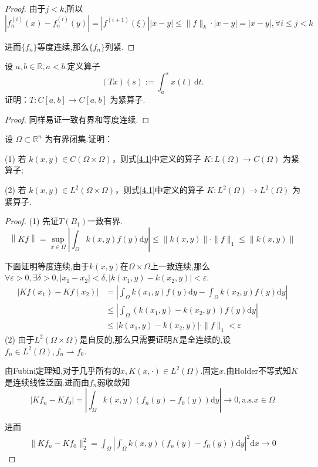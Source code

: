 \documentclass[lang=cn,newtx,10pt,scheme=chinese,thmcnt=chapter]{elegantbook}
\newcommand{\dif}{\mathrm{d}}
\begin{document}
\begin{problemset}
\begin{proof}
    由于$j<k$,所以
    \[|f^{(i)}_n(x)-f^{(i)}_n(y)|=|f^{(i+1)}(\xi)||x-y|\leqslant \|f\|_k\cdot|x-y|=|x-y|,\forall i\leqslant j<k\]

    进而$\{f_n\}$等度连续,那么$\{f_n\}$列紧.

    
\end{proof}
  \item 设 \(a,b \in  \mathbb{R}, a < b\).定义算子
  \[
  (Tx)(s) := \int_{a}^{s} x(t)\,\dif t.
  \]
  证明：\(T : C[a,b] \to C[a,b]\) 为紧算子.
\begin{proof}
    同样易证一致有界和等度连续.
\end{proof}
  \item 设 \(\Omega  \subset  \mathbb{R}^{n}\) 为有界闭集.证明：  
  
  (1) 若 \(k(x,y) \in  C(\Omega  \times  \Omega)\)，则式\ref{4.1}中定义的算子 \(K : L(\Omega) \to C(\Omega)\) 为紧算子;  
  
  (2) 若 \(k(x,y) \in  L^{2}(\Omega  \times  \Omega)\)，则式\ref{4.1}中定义的算子 \(K : L^{2}(\Omega) \to L^{2}(\Omega)\) 为紧算子.
\begin{proof}
    (1) 先证$T(B_1)$一致有界.
    \[\left\|K f\right\|=\sup\limits_{x\in \Omega}\left|\int_\Omega k(x,y)f(y)\dif y\right|\leqslant \|k(x,y)\|\cdot \|f\|_1\leqslant\|k(x,y)\| \]

    下面证明等度连续,由于$k(x,y)$在$\Omega\times \Omega$上一致连续,那么$\forall \varepsilon>0,\exists \delta >0,|x_1-x_2|<\delta,|k(x_1,y)-k(x_2,y)|<\varepsilon $.
    \begin{equation*}
            \begin{aligned}
            \left|Kf(x_1)-Kf(x_2)\right|&=\left|\int_\Omega k(x_1,y)f(y)\dif y -\int_\Omega k(x_2,y)f(y)\dif  y\right|\\
            &\leqslant \left|\int_\Omega \left(k(x_1,y)-k(x_2,y)\right)f(y)\dif  y\right|\\
            &\leqslant \left| k(x_1,y)-k(x_2,y)\right|\cdot \|f\|_1<\varepsilon
    \end{aligned}
\end{equation*}
    (2) 由于$L^2(\Omega\times \Omega)$是自反的,那么只需要证明$K$是全连续的,设$f_n\in L^2(\Omega),f_n \rightharpoonup f_0$.

    由Fubini定理知,对于几乎所有的$x,K(x,\cdot)\in L^2(\Omega)$.固定$x$,由Holder不等式知$K$是连续线性泛函.进而由$f_n$弱收敛知
\[\left|Kf_n -Kf_0\right|=\left|\int_\Omega k(x,y)(f_n(y)-f_0(y))\dif y\right|\to 0,\text{a.s.}x\in \Omega\]

进而
\begin{equation*}
        \begin{aligned}
\|Kf_n -Kf_0\|_2^2=\int_\Omega \left|\int_\Omega k(x,y)(f_n(y)-f_0(y))\dif y\right|^2\dif x\to 0
        \end{aligned}
    \end{equation*}




\end{proof}
\end{problemset}
\end{document}
